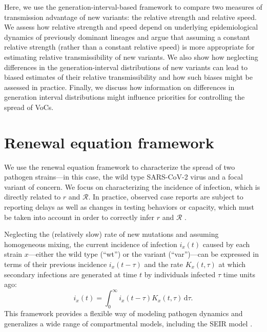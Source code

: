 \documentclass[12pt]{article}
\newcommand{\RR}{\ensuremath{{\mathcal R}}\xspace}
\newcommand{\dd}[1]{\ensuremath{\, \mathrm{d}#1}}
\newcommand{\dtau}{\dd{\tau}}
\begin{document}
Here, we use the generation-interval-based framework to compare two measures of transmission advantage of new variants: the relative strength and relative speed.
We assess how relative strength and speed depend on underlying epidemiological dynamics of previously dominant lineages and argue that assuming a constant relative strength (rather than a constant relative speed) is more appropriate for estimating relative transmissibility of new variants.
We also show how neglecting differences in the generation-interval distributions of new variants can lead to biased estimates of their relative transmissibility and how such biases might be assessed in practice.
Finally, we discuss how information on differences in generation interval distributions might influence priorities for controlling the spread of VoCs.

\section{Renewal equation framework}

We use the renewal equation framework to characterize the spread of two pathogen strains---in this case, the wild type SARS-CoV-2 virus and a focal variant of concern.
We focus on characterizing the incidence of infection, which is directly related to $r$ and $\RR$.
In practice, observed case reports are subject to reporting delays as well as changes in testing behaviors or capacity, which must be taken into account in order to correctly infer $r$ and $\RR$ \citep{goldstein2009reconstructing,gostic2020practical}.

Neglecting the (relatively slow) rate of new mutations and assuming homogeneous mixing, the current incidence of infection $i_x(t)$ caused by each strain $x$---either the wild type (``wt'') or the variant (``var'')---can be expressed in terms of their previous incidence $i_x(t-\tau)$ and the rate $K_x(t, \tau)$ at which secondary infections are generated at time $t$ by individuals infected $\tau$ time units ago:
\begin{equation}
i_x(t) = \int_0^\infty i_x(t-\tau) K_x(t, \tau) \dtau.
\end{equation}
This framework provides a flexible way of modeling pathogen dynamics and generalizes a wide range of compartmental models, including the SEIR model \citep{heesterbeek1996concept, diekmann2000mathematical, roberts2004modelling, aldis2005integral,breda2012formulation, champredon2018equivalence}.
\end{document}
